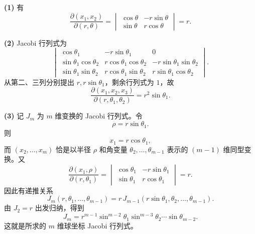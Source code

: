 \begin{xsolution}
\textbf{(1)} 有
\[
  \frac{\partial(x_1,x_2)}{\partial(r,\theta)}
  =
  \begin{vmatrix}
    \cos\theta&-r\sin\theta\\
    \sin\theta&r\cos\theta
  \end{vmatrix}
  =\boxed{r}.
\]

\textbf{(2)} Jacobi 行列式为
\[
  \begin{vmatrix}
    \cos\theta_1&-r\sin\theta_1&0\\
    \sin\theta_1\cos\theta_2&r\cos\theta_1\cos\theta_2&-r\sin\theta_1\sin\theta_2\\
    \sin\theta_1\sin\theta_2&r\cos\theta_1\sin\theta_2&r\sin\theta_1\cos\theta_2
  \end{vmatrix}.
\]
从第二、三列分别提出 $r,r\sin\theta_1$，剩余行列式为 $1$，故
\[
  \boxed{
  \frac{\partial(x_1,x_2,x_3)}{\partial(r,\theta_1,\theta_2)}
  =r^2\sin\theta_1}.
\]

\textbf{(3)} 记 $J_m$ 为 $m$ 维变换的 Jacobi 行列式。令
\[
  \rho=r\sin\theta_1.
\]
则
\[
  x_1=r\cos\theta_1,
\]
而 $(x_2,\ldots,x_m)$ 恰是以半径 $\rho$ 和角变量 $\theta_2,\ldots,\theta_{m-1}$ 表示的 $(m-1)$ 维同型变换。又
\[
  \frac{\partial(x_1,\rho)}{\partial(r,\theta_1)}
  =
  \begin{vmatrix}
    \cos\theta_1&-r\sin\theta_1\\
    \sin\theta_1&r\cos\theta_1
  \end{vmatrix}
  =r.
\]
因此有递推关系
\[
  J_m(r,\theta_1,\ldots,\theta_{m-1})
  =r\,J_{m-1}(r\sin\theta_1,\theta_2,\ldots,\theta_{m-1}).
\]
由 $J_2=r$ 出发归纳，得到
\[
  \boxed{
  J_m
  =r^{m-1}
   \sin^{m-2}\theta_1
   \sin^{m-3}\theta_2\cdots
   \sin\theta_{m-2}}.
\]
这就是所求的 $m$ 维球坐标 Jacobi 行列式。
\end{xsolution}


